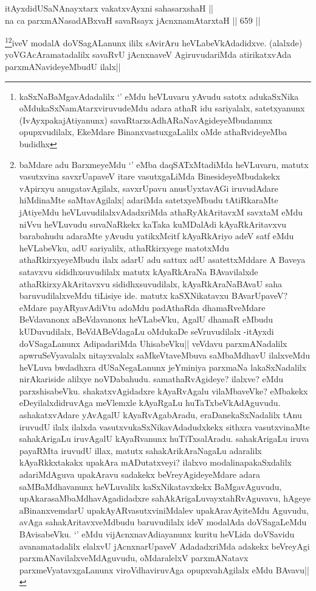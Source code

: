 \begin{shl}
itAyxdidUSaNAnayxtarx vakatxvAyxni sahasarxshaH || \\
na ca parxmANasadABxvaH savaRsayx jAcnxnamAtarxtaH ||  659 ||  
\end{shl}

\begin{artha}
\footnote{kaSxNaBaMgavAdadalilx `\stext' eMdu heVLuvaru yAvudu satotx adukaSxNika oMdukaSxNamAtarxviruvudeMdu adara athaR idu sariyalalx, satetxyanunx (IvAyxpakajAtiyanunx) savaRtarxsAdhARaNavAgideyeMbudanunx opupxvudilalx, EkeMdare BinanxvastuxgaLalilx oMde athaRvideyeMba budidhx}\footnote{baMdare adu BarxmeyeMdu `\stext' eMba daqSATxMtadiMda heVLuvaru, matutx vasutxvina savxrUapaveV itare vasutxgaLiMda BinesideyeMbudakekx vApirxyu anugatavAgilalx, savxrUpavu anusUyxtavAGi iruvudAdare hiMdinaMte saMtavAgilalx| adariMda satetxyeMbudu tAtiRkaraMte jAtiyeMdu heVLuvudilalxvAdadxriMda athaRyAkAritavxM savxtaM eMdu niVvu heVLuvudu suvaNaRkekx kaTaka kuMDalAdi kAyaRkAritavxvu barabahudu adaraMte yAvudu yatikxMcitf kAyaRkAriyo adeV satf eMdu heVLabeVku, adU sariyalilx, athaRkirxyege matotxMdu athaRkirxyeyeMbudu ilalx adarU adu sattux adU asatettxMddare A Baveya satavxvu sididhxsuvudilalx matutx kAyaRkAraNa BAvavilalxde athaRkirxyAkAritavxvu sididhxsuvudilalx, kAyaRkAraNaBAvaU saha baruvudilalxveMdu tiLisiye ide. matutx kaSXNikatavxu BAvarUpaveV? eMdare payARyavAdiVtu adoMdu padAthaRda dhamaRveMdare BeVdavanonx aBeVdavanonx heVLabeVku, AgalU dhamaR eMbudu kUDuvudilalx, BeVdABeVdagaLu oMdukaDe seVruvudilalx -itAyxdi doVSagaLanunx AdipadariMda UhisabeVku|| veVdavu parxmANadalilx apwruSeVyavalalx nitayxvalalx saMkeVtaveMbuva saMbaMdhavU ilalxveMdu heVLuva bwdadhxra dUSaNegaLanunx jeYminiya parxmaNa lakaSxNadalilx nirAkariside alilxye noVDabahudu. samathaRvAgideye? ilalxve? eMdu parxshisabeVku. shakatxvAgidadxre kAyaRvAgalu vilaMbaveVke? eMbakekx eDeyilalxdidruvAga meVlemxle kAyaRgaLu huTaTxbeVkAdAguvudu. ashakatxvAdare yAvAgalU kAyaRvAgabAradu, eraDanekaSxNadalilx tAnu iruvudU ilalx ilalxda vasutxvukaSxNikavAdadudxkekx sithxra vasutxvinaMte sahakArigaLu iruvAgalU kAyaRvanunx huTiTxsalAradu. sahakArigaLu iruva payaRMta iruvudU illax, matutx sahakArikAraNagaLu adaralilx kAyaRkkxtakakx upakAra mADutatxveyi? ilalxvo modalinapakaSxdalilx adariMdAguva upakAravu sadakekx beVreyAgideyeMdare adara saMBaMdhavanunx heVLuvalilx kaSxNikatavxkekx BaMgavAguvudu, upAkarasaMbaMdhavAgadidadxre sahAkArigaLuvayxtahRvAguvavu, hAgeye aBinanxvemdarU upakAyARvasutxviniMdalev upakAravAyiteMdu Aguvudu, avAga sahakAritavxveMdbudu baruvudilalx ideV modalAda doVSagaLeMdu BAvisabeVku. `\stext' eMdu vijAcnxnavAdiayanunx kuritu heVLida doVSavidu avanamatadalilx elalxvU jAcnxnarUpaveV AdadadxriMda adakekx beVreyAgi parxmANavilalxveMdAguvudu, oMdaralelxV parxmANatavx parxmeVyatavxgaLanunx viroVdhaviruvAga opupxvahAgilalx eMdu BAvavu||}iveV modalA doVSagALanunx ililx sAvirAru heVLabeVkAdadidxve. (alalxde) yoVGAcAramatadalilx savaRvU jAcnxnaveV AgiruvudariMda atirikatxvAda parxmANavideyeMbudU ilalx||
\end{artha}

